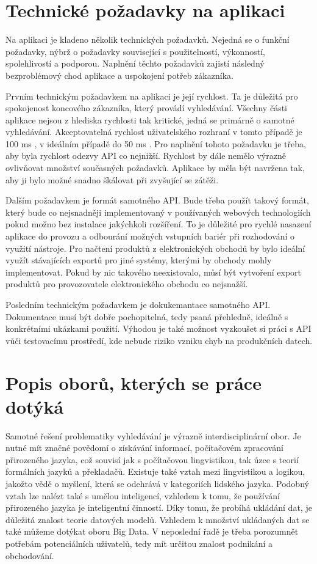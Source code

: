 \documentclass[FM,DP]{tulthesis}
\begin{document}
\section{Technické požadavky na aplikaci}

Na aplikaci je kladeno několik technických požadavků. Nejedná se o funkční požadavky, nýbrž
o požadavky související s použitelností, výkonností, spolehlivostí a podporou. Naplnění těchto
požadavků zajistí následný bezproblémový chod aplikace a uspokojení potřeb zákazníka.

Prvním technickým požadavkem na aplikaci je její rychlost. Ta je důležitá pro spokojenost
koncového zákazníka, který provádí vyhledávání. Všechny části aplikace nejsou z hlediska rychlosti
tak kritické, jedná se primárně o samotné vyhledávání. Akceptovatelná rychlost uživatelského rozhraní 
v tomto případě je 100 ms \cite{amazon-100ms}, v ideálním případě do 50 ms \cite{stackshare-algolia}. 
Pro naplnění tohoto požadavku je třeba, aby byla rychlost odezvy API co nejnižší.
Rychlost by dále nemělo výrazně ovlivňovat množství současných požadavků. 
Aplikace by měla být navržena tak, aby ji bylo možné snadno škálovat při zvyšující se zátěži.

Dalším požadavkem je formát samotného API. Bude třeba použít takový formát, který bude
co nejsnadněji implementovaný v používaných webových technologiích pokud možno bez instalace
jakýchkoli rozšíření. To je důležité pro rychlé nasazení aplikace do provozu a odbourání
možných vstupních bariér při rozhodování o využití nástroje. Pro načtení produktů
z elektronických obchodů by bylo ideální využít stávajících exportů pro jiné systémy, 
kterými by obchody mohly implementovat. Pokud by nic takového neexistovalo, můsí být vytvoření
export produktů pro provozovatele elektronického obchodu co nejsnažší.

Posledním technickým požadavkem je dokukemantace samotného API. Dokumentace musí být
dobře pochopitelná, tedy psaná přehledně, ideálně s konkrétními ukázkami použití.
Výhodou je také možnost vyzkoušet si práci s API vůči testovacímu prostředí, 
kde nebude riziko vzniku chyb na produkčních datech.

\section{Popis oborů, kterých se práce dotýká}

Samotné řešení problematiky vyhledávání je výrazně interdisciplinární obor. Je nutné
mít značné povědomí o získávání informací, počítačovém zpracování přirozeného jazyka, 
což souvisí jak s počítačovou lingvistikou, tak úzce s teorií formálních jazyků a překladačů.
Existuje také vztah mezi lingvistikou a logikou, jakožto vědě o myšlení, která se odehrává 
v kategoriích lidského jazyka. Podobný vztah lze nalézt také s umělou inteligencí, 
vzhledem k tomu, že používání přirozeného jazyka je inteligentní činností.
Díky tomu, že probíhá ukládání dat, je důležitá znalost teorie datových modelů.
Vzhledem k množství ukládaných dat se také můžeme dotýkat oboru Big Data.
V neposlední řadě je třeba porozumnět potřebám potenciálních uživatelů, tedy mít
určitou znalost podnikání a obchodování.
\end{document}
